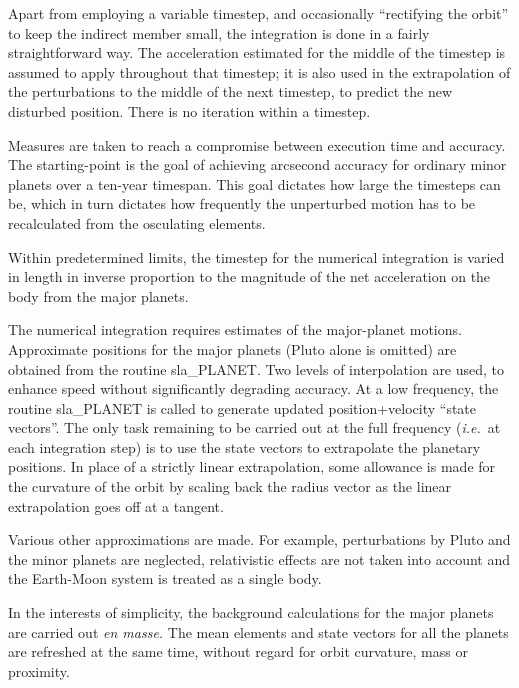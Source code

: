 \documentclass[11pt,twoside]{article}
\begin{document}
{\begin{enumerate}
        Apart from employing a variable timestep, and occasionally
        ``rectifying the orbit'' to keep the indirect member small, the
        integration is done in a fairly straightforward way.  The
        acceleration estimated for the middle of the timestep is assumed
        to apply throughout that timestep;  it is also used in the
        extrapolation of the perturbations to the middle of the next
        timestep, to predict the new disturbed position.  There is no
        iteration within a timestep.

        Measures are taken to reach a compromise between execution time
        and accuracy.  The starting-point is the goal of achieving
        arcsecond accuracy for ordinary minor planets over a ten-year
        timespan.  This goal dictates how large the timesteps can be,
        which in turn dictates how frequently the unperturbed motion has
        to be recalculated from the osculating elements.

        Within predetermined limits, the timestep for the numerical
        integration is varied in length in inverse proportion to the
        magnitude of the net acceleration on the body from the major
        planets.

        The numerical integration requires estimates of the major-planet
        motions.  Approximate positions for the major planets (Pluto
        alone is omitted) are obtained from the routine sla\_PLANET.  Two
        levels of interpolation are used, to enhance speed without
        significantly degrading accuracy.  At a low frequency, the routine
        sla\_PLANET is called to generate updated position+velocity ``state
        vectors''.  The only task remaining to be carried out at the full
        frequency ({\it i.e.}\ at each integration step) is to use the state
        vectors to extrapolate the planetary positions.  In place of a
        strictly linear extrapolation, some allowance is made for the
        curvature of the orbit by scaling back the radius vector as the
        linear extrapolation goes off at a tangent.

        Various other approximations are made.  For example, perturbations
        by Pluto and the minor planets are neglected, relativistic effects
        are not taken into account and the Earth-Moon system is treated as
        a single body.

        In the interests of simplicity, the background calculations for
        the major planets are carried out {\it en masse.}
        The mean elements and
        state vectors for all the planets are refreshed at the same time,
        without regard for orbit curvature, mass or proximity.


\end{enumerate}}
\end{document}
